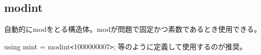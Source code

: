 \subsection{modint}

自動的にmodをとる構造体。modが問題で固定かつ素数であるとき使用できる。

using mint = modint\verb|<|1000000007\verb|>|; 等のように定義して使用するのが推奨。


